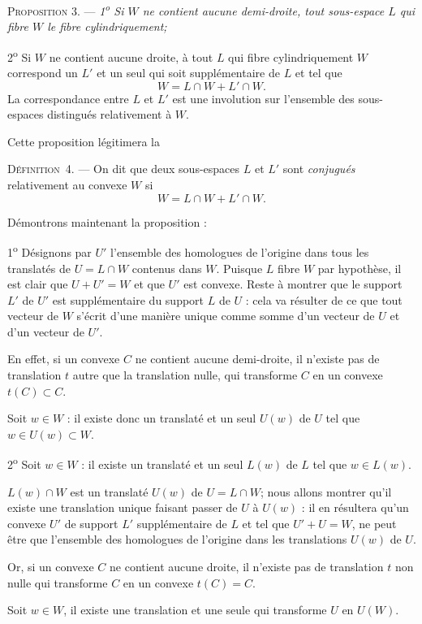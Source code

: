 \documentclass[11pt]{article}
\newcommand{\bznum}[1]{\if\relax\detokenize{#1}\relax\else\ #1\fi}
\newenvironment{defin}[1][]{\par\medskip\noindent\textsc{Définition\bznum{#1}.} --- }{\par\medskip}
\newenvironment{prop}[1][]{\par\medskip\noindent\textsc{Proposition #1.} --- \itshape}{\par\medskip}
\newenvironment{proof}[1][]{\par}{\par}
\begin{document}
\begin{prop}[3]
1\textsuperscript{o} Si $W$ ne contient aucune demi-droite, tout sous-espace $L$ qui fibre $W$ le
fibre cylindriquement;

2\textsuperscript{o} Si $W$ ne contient aucune droite, à tout $L$ qui fibre cylindriquement $W$
correspond un $L'$ et un seul qui soit supplémentaire de $L$ et tel que
\[ W=L\cap W+L'\cap W. \]
La correspondance entre $L$ et $L'$ est une involution sur l'ensemble des sous-espaces distingués
relativement à $W$.
\end{prop}

Cette proposition légitimera la

\begin{defin}[4]
On dit que deux sous-espaces $L$ et $L'$ sont \textit{conjugués} relativement au convexe $W$ si
\[ W=L\cap W+L'\cap W. \]
\end{defin}

\begin{proof}[Proof of \ref{bzprop:c3s2p3_fibre_cylindriquement}]
Démontrons maintenant la proposition :

1\textsuperscript{o} Désignons par $U'$ l'ensemble des homologues de l'origine dans tous les
translatés de $U=L\cap W$ contenus dans $W$. Puisque $L$ fibre $W$ par hypothèse, il est clair
que $U+U'=W$ et que $U'$ est convexe. Reste à montrer que le support $L'$ de $U'$ est
supplémentaire du support $L$ de $U$ : cela va résulter de ce que tout vecteur de $W$ s'écrit
d'une manière unique comme somme d'un vecteur de $U$ et d'un vecteur de $U'$.

En effet, si un convexe $C$ ne contient aucune demi-droite, il n'existe pas de translation $t$
autre que la translation nulle, qui transforme $C$ en un convexe $t(C)\subset C$.

Soit $w\in W$ : il existe donc un translaté et un seul $U(w)$ de $U$ tel que
$w\in U(w)\subset W$.

2\textsuperscript{o} Soit $w\in W$ : il existe un translaté et un seul $L(w)$ de $L$ tel que
$w\in L(w)$.

$L(w)\cap W$ est un translaté $U(w)$ de $U=L\cap W$; nous allons montrer qu'il existe une
translation unique faisant passer de $U$ à $U(w)$ : il en résultera qu'un convexe $U'$ de support
$L'$ supplémentaire de $L$ et tel que $U'+U=W$, ne peut être que l'ensemble des homologues de
l'origine dans les translations $U(w)$ de $U$.

Or, si un convexe $C$ ne contient aucune droite, il n'existe pas de translation $t$ non nulle qui
transforme $C$ en un convexe $t(C)=C$.

Soit $w\in W$, il existe une translation et une seule qui transforme $U$ en $U(W)$.
\end{proof}
\end{document}
